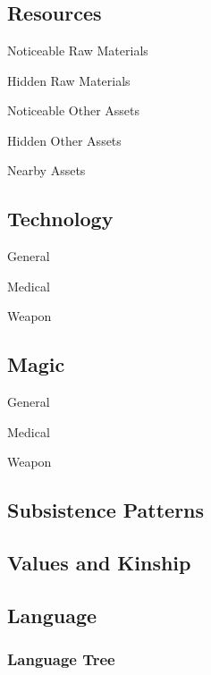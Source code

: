 \chapter{}

\section{Resources}

\begin{relate}
	\item[Noticeable Raw Materials]
	\item[Hidden Raw Materials]
	\item[Noticeable Other Assets]
	\item[Hidden Other Assets]
	\item[Nearby Assets]
\end{relate}

\section{Technology}
\begin{relate}
	\item[General]
	\item[Medical]
	\item[Weapon]
\end{relate}

\section{Magic}
\begin{relate}
	\item[General]
	\item[Medical]
	\item[Weapon]
\end{relate}

\section{Subsistence Patterns}

\section{Values and Kinship}

\section{Language}
\subsection{Language Tree}

